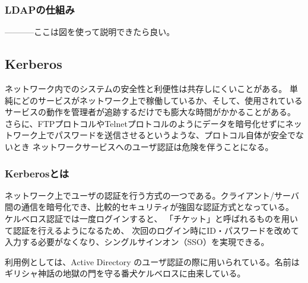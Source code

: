 \documentclass[12pt,a4paper,titlepage]{jsarticle}
\begin{document}
\subsubsection*{LDAPの仕組み}
-----------ここは図を使って説明できたら良い。

\subsection{Kerberos}
ネットワーク内でのシステムの安全性と利便性は共存しにくいことがある。
単純にどのサービスがネットワーク上で稼働しているか、そして、使用されているサービスの動作を管理者が追跡するだけでも膨大な時間がかかることがある。
さらに、FTPプロトコルやTelnetプロトコルのようにデータを暗号化せずにネットワーク上でパスワードを送信させるというような、プロトコル自体が安全でないとき
ネットワークサービスへのユーザ認証は危険を伴うことになる。


\subsubsection*{Kerberosとは}
ネットワーク上でユーザの認証を行う方式の一つである。クライアント/サーバ間の通信を暗号化でき、比較的セキュリティが強固な認証方式となっている。
ケルベロス認証では一度ログインすると、
「チケット」と呼ばれるものを用いて認証を行えるようになるため、
次回のログイン時にID・パスワードを改めて入力する必要がなくなり、シングルサインオン（SSO）を実現できる。\par 
利用例としては、Active Directory のユーザ認証の際に用いられている。名前はギリシャ神話の地獄の門を守る番犬ケルベロスに由来している。
\end{document}

